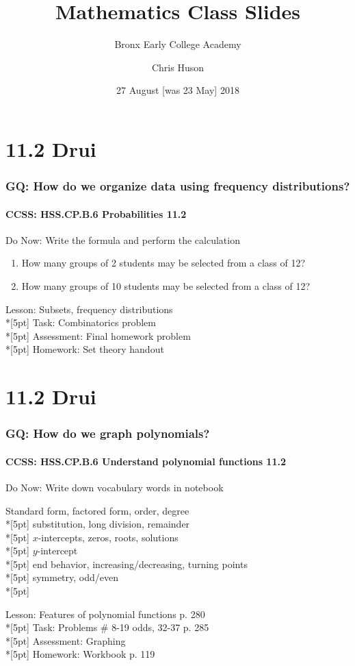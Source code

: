 \documentclass{beamer}
\title{Mathematics Class Slides}
\subtitle{Bronx Early College Academy}
\author{Chris Huson}
\date{27 August [was 23 May] 2018}
\begin{document}
\frame{\titlepage}



\section{11.2 Drui}
\frame
{
  \frametitle{GQ: How do we organize data using frequency distributions?}
  \framesubtitle{CCSS: HSS.CP.B.6 Probabilities \qquad \qquad \qquad \alert{11.2}}

  \begin{block}{Do Now: Write the formula and perform the calculation}
  \begin{enumerate}
      \item How many groups of 2 students may be selected from a class of 12?
      \item How many groups of 10 students may be selected from a class of 12?
  \end{enumerate}
  \end{block}
  Lesson: Subsets, frequency distributions\\*[5pt]
  Task: Combinatorics problem\\*[5pt]
  Assessment: Final homework problem\\*[5pt]
  Homework: Set theory handout
}

\section{11.2 Drui}
\frame
{
  \frametitle{GQ: How do we graph polynomials?}
  \framesubtitle{CCSS: HSS.CP.B.6 Understand polynomial functions \qquad \qquad \qquad \alert{11.2}}

  \begin{block}{Do Now: Write down vocabulary words in notebook}
  \begin{enumerate}
    Standard form, factored form, order, degree\\*[5pt]
    substitution, long division, remainder\\*[5pt]
    $x$-intercepts, zeros, roots, solutions\\*[5pt]
    $y$-intercept\\*[5pt]
    end behavior, increasing/decreasing, turning points\\*[5pt]
    symmetry, odd/even\\*[5pt]
  \end{enumerate}
  \end{block}
  Lesson: Features of polynomial functions p. 280\\*[5pt]
  Task: Problems \# 8-19 odds, 32-37 p. 285\\*[5pt]
  Assessment: Graphing\\*[5pt]
  Homework: Workbook p. 119
}
\end{document}
